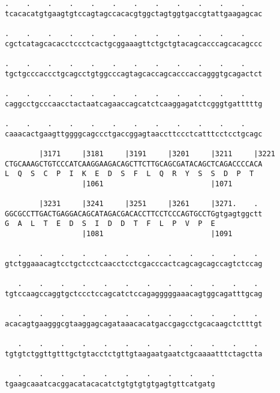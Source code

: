\documentclass{article}
\begin{document}
\begin{Verbatim}
.    .    .    .    .    .    .    .    .    .    .    .    
tcacacatgtgaagtgtccagtagccacacgtggctagtggtgaccgtattgaagagcac
                                                            
.    .    .    .    .    .    .    .    .    .    .    .    
cgctcatagcacacctccctcactgcggaaagttctgctgtacagcacccagcacagccc
                                                            
.    .    .    .    .    .    .    .    .    .    .    .    
tgctgcccaccctgcagcctgtggcccagtagcaccagcacccaccagggtgcagactct
                                                            
.    .    .    .    .    .    .    .    .    .    .    .    
caggcctgcccaacctactaatcagaaccagcatctcaaggagatctcgggtgatttttg
                                                            
.    .    .    .    .    .    .    .    .    .    .    .    
caaacactgaagttggggcagccctgaccggagtaaccttccctcatttcctcctgcagc
                                                            
        |3171     |3181     |3191     |3201     |3211     |3221
CTGCAAAGCTGTCCCATCAAGGAAGACAGCTTCTTGCAGCGATACAGCTCAGACCCCACA
L  Q  S  C  P  I  K  E  D  S  F  L  Q  R  Y  S  S  D  P  T  
                  |1061                         |1071       
  
        |3231     |3241     |3251     |3261     |3271.    . 
GGCGCCTTGACTGAGGACAGCATAGACGACACCTTCCTCCCAGTGCCTGgtgagtggctt
G  A  L  T  E  D  S  I  D  D  T  F  L  P  V  P  E           
                  |1081                         |1091       
  
   .    .    .    .    .    .    .    .    .    .    .    . 
gtctggaaacagtcctgctcctcaacctcctcgacccactcagcagcagccagtctccag
                                                            
   .    .    .    .    .    .    .    .    .    .    .    . 
tgtccaagccaggtgctccctccagcatctccagagggggaaacagtggcagatttgcag
                                                            
   .    .    .    .    .    .    .    .    .    .    .    . 
acacagtgaagggcgtaaggagcagataaacacatgaccgagcctgcacaagctctttgt
                                                            
   .    .    .    .    .    .    .    .    .    .    .    . 
tgtgtctggttgtttgctgtacctctgttgtaagaatgaatctgcaaaatttctagctta
                                                            
   .    .    .    .    .    .    .    .    .    .
tgaagcaaatcacggacatacacatctgtgtgtgtgagtgttcatgatg
                                                 

\end{Verbatim}
\end{document}

